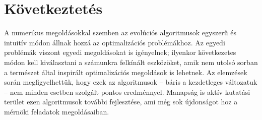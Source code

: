 \chapter{Következtetés}

A numerikus megoldásokkal szemben az evolúciós algoritmusok egyszerű és intuitív módon állnak hozzá az optimalizációs problémákhoz. Az egyedi problémák viszont egyedi megoldásokat is igényelnek; ilyenkor következetes módon kell kiválasztani a számunkra felkínált eszközöket, amik nem utolsó sorban a természet által inspirált optimalizációs megoldások is lehetnek.
Az elemzések során megfigyelhettük, hogy ezek az algoritmusok -- báris a kezdetleges változatuk -- nem minden esetben szolgált pontos eredménnyel. Manapság is aktív kutatási terület ezen algoritmusok további fejlesztése, ami még sok újdonságot hoz a mérnöki feladatok megoldásaiban.
